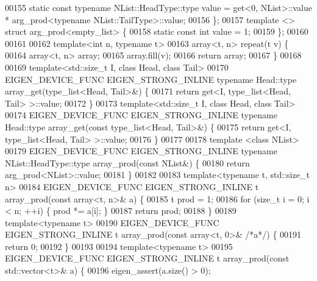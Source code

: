\begin{DoxyCode}
00155   \textcolor{keyword}{static} \textcolor{keyword}{const} \textcolor{keyword}{typename} NList::HeadType::type value = get<0, NList>::value * arg\_prod<typename
       NList::TailType>::value;
00156 \};
00157 \textcolor{keyword}{template} <> \textcolor{keyword}{struct }arg\_prod<empty\_list> \{
00158   \textcolor{keyword}{static} \textcolor{keyword}{const} \textcolor{keywordtype}{int} value = 1;
00159 \};
00160 
00161 
00162 \textcolor{keyword}{template}<\textcolor{keywordtype}{int} n, \textcolor{keyword}{typename} t>
00163 array<t, n> repeat(t v) \{
00164   array<t, n> array;
00165   array.fill(v);
00166   \textcolor{keywordflow}{return} array;
00167 \}
00168 
00169 \textcolor{keyword}{template}<std::\textcolor{keywordtype}{size\_t} I, \textcolor{keyword}{class} Head, \textcolor{keyword}{class} Tail>
00170 EIGEN\_DEVICE\_FUNC EIGEN\_STRONG\_INLINE \textcolor{keyword}{typename} Head::type array\_get(type\_list<Head, Tail>&) \{
00171   \textcolor{keywordflow}{return} get<I, type\_list<Head, Tail> >::value;
00172 \}
00173 \textcolor{keyword}{template}<std::\textcolor{keywordtype}{size\_t} I, \textcolor{keyword}{class} Head, \textcolor{keyword}{class} Tail>
00174 EIGEN\_DEVICE\_FUNC EIGEN\_STRONG\_INLINE \textcolor{keyword}{typename} Head::type array\_get(\textcolor{keyword}{const} type\_list<Head, Tail>&) \{
00175   \textcolor{keywordflow}{return} get<I, type\_list<Head, Tail> >::value;
00176 \}
00177 
00178 \textcolor{keyword}{template} <\textcolor{keyword}{class} NList>
00179 EIGEN\_DEVICE\_FUNC EIGEN\_STRONG\_INLINE \textcolor{keyword}{typename} NList::HeadType::type array\_prod(\textcolor{keyword}{const} NList&) \{
00180   \textcolor{keywordflow}{return} arg\_prod<NList>::value;
00181 \}
00182 
00183 \textcolor{keyword}{template}<\textcolor{keyword}{typename} t, std::\textcolor{keywordtype}{size\_t} n>
00184 EIGEN\_DEVICE\_FUNC EIGEN\_STRONG\_INLINE t array\_prod(\textcolor{keyword}{const} array<t, n>& a) \{
00185   t prod = 1;
00186   \textcolor{keywordflow}{for} (\textcolor{keywordtype}{size\_t} i = 0; i < n; ++i) \{ prod *= a[i]; \}
00187   \textcolor{keywordflow}{return} prod;
00188 \}
00189 \textcolor{keyword}{template}<\textcolor{keyword}{typename} t>
00190 EIGEN\_DEVICE\_FUNC EIGEN\_STRONG\_INLINE t array\_prod(\textcolor{keyword}{const} array<t, 0>& \textcolor{comment}{/*a*/}) \{
00191   \textcolor{keywordflow}{return} 0;
00192 \}
00193 
00194 \textcolor{keyword}{template}<\textcolor{keyword}{typename} t>
00195 EIGEN\_DEVICE\_FUNC EIGEN\_STRONG\_INLINE t array\_prod(\textcolor{keyword}{const} std::vector<t>& a) \{
00196   eigen\_assert(a.size() > 0);

\end{DoxyCode}
